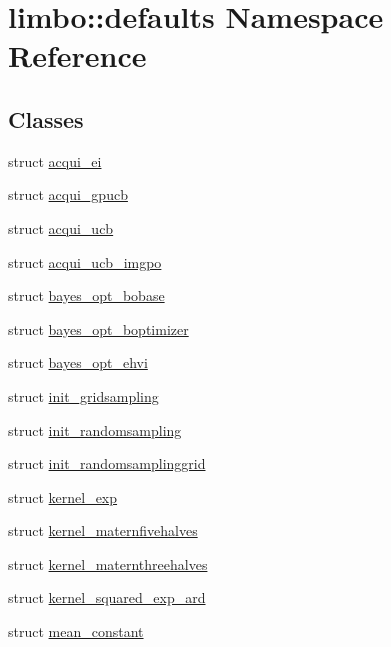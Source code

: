 \hypertarget{namespacelimbo_1_1defaults}{}\section{limbo\+:\+:defaults Namespace Reference}
\label{namespacelimbo_1_1defaults}
\subsection*{Classes}
\begin{DoxyCompactItemize}
\item 
struct \hyperlink{structlimbo_1_1defaults_1_1acqui__ei}{acqui\+\_\+ei}
\item 
struct \hyperlink{structlimbo_1_1defaults_1_1acqui__gpucb}{acqui\+\_\+gpucb}
\item 
struct \hyperlink{structlimbo_1_1defaults_1_1acqui__ucb}{acqui\+\_\+ucb}
\item 
struct \hyperlink{structlimbo_1_1defaults_1_1acqui__ucb__imgpo}{acqui\+\_\+ucb\+\_\+imgpo}
\item 
struct \hyperlink{structlimbo_1_1defaults_1_1bayes__opt__bobase}{bayes\+\_\+opt\+\_\+bobase}
\item 
struct \hyperlink{structlimbo_1_1defaults_1_1bayes__opt__boptimizer}{bayes\+\_\+opt\+\_\+boptimizer}
\item 
struct \hyperlink{structlimbo_1_1defaults_1_1bayes__opt__ehvi}{bayes\+\_\+opt\+\_\+ehvi}
\item 
struct \hyperlink{structlimbo_1_1defaults_1_1init__gridsampling}{init\+\_\+gridsampling}
\item 
struct \hyperlink{structlimbo_1_1defaults_1_1init__randomsampling}{init\+\_\+randomsampling}
\item 
struct \hyperlink{structlimbo_1_1defaults_1_1init__randomsamplinggrid}{init\+\_\+randomsamplinggrid}
\item 
struct \hyperlink{structlimbo_1_1defaults_1_1kernel__exp}{kernel\+\_\+exp}
\item 
struct \hyperlink{structlimbo_1_1defaults_1_1kernel__maternfivehalves}{kernel\+\_\+maternfivehalves}
\item 
struct \hyperlink{structlimbo_1_1defaults_1_1kernel__maternthreehalves}{kernel\+\_\+maternthreehalves}
\item 
struct \hyperlink{structlimbo_1_1defaults_1_1kernel__squared__exp__ard}{kernel\+\_\+squared\+\_\+exp\+\_\+ard}
\item 
struct \hyperlink{structlimbo_1_1defaults_1_1mean__constant}{mean\+\_\+constant}

\end{DoxyCompactItemize}
